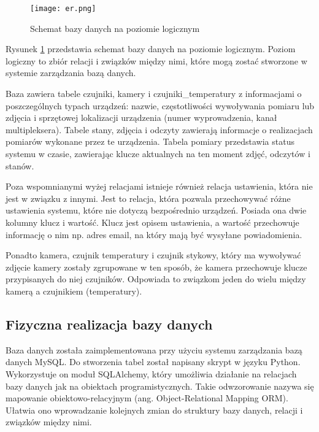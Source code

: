 \documentclass[a4paper,12pt,twoside]{article}
\begin{document}
\begin{figure}[h]
\texttt{[image: er.png]}
\caption{Schemat bazy danych na poziomie logicznym}
\label{fig: er}
\end{figure}

Rysunek \ref{fig: er} przedstawia schemat bazy danych na poziomie logicznym. Poziom logiczny to zbiór relacji i związków między nimi, które mogą zostać stworzone w systemie zarządzania bazą danych.  

Baza zawiera tabele czujniki, kamery i czujniki{\_}temperatury z informacjami o poszczególnych typach urządzeń: nazwie, częstotliwości wywoływania pomiaru lub zdjęcia i sprzętowej lokalizacji urządzenia (numer wyprowadzenia, kanał multipleksera). Tabele stany, zdjęcia i odczyty zawierają informacje o realizacjach pomiarów wykonane przez te urządzenia. Tabela pomiary przedstawia status systemu w czasie, zawierając klucze aktualnych na ten moment zdjęć, odczytów i stanów. 

Poza wspomnianymi wyżej relacjami istnieje również relacja ustawienia, która nie jest w związku z innymi. Jest to relacja, która pozwala przechowywać różne ustawienia systemu, które nie dotyczą bezpośrednio urządzeń. Posiada ona dwie kolumny klucz i wartość. Klucz jest opisem ustawienia, a wartość przechowuje informację o nim np. adres email, na który mają być wysyłane powiadomienia. 

Ponadto kamera, czujnik temperatury i czujnik stykowy, który ma wywoływać zdjęcie kamery zostały zgrupowane w ten sposób, że kamera przechowuje klucze przypisanych do niej czujników. Odpowiada to związkom jeden do wielu między kamerą a czujnikiem (temperatury).

\subsection{Fizyczna realizacja bazy danych}
Baza danych została zaimplementowana przy użyciu systemu zarządzania bazą danych MySQL. Do stworzenia tabel został napisany skrypt w języku Python. Wykorzystuje on moduł SQLAlchemy, który umożliwia działanie na relacjach bazy danych jak na obiektach programistycznych. Takie odwzorowanie nazywa się mapowanie obiektowo-relacyjnym (ang. Object-Relational Mapping ORM). Ułatwia ono wprowadzanie kolejnych zmian do struktury bazy danych, relacji i związków między nimi.
\end{document}
